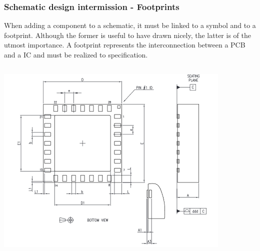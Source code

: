 \documentclass[11pt,xcolor=table,aspectratio=169]{beamer}
\begin{document}
	\begin{frame}
		\frametitle{Schematic design intermission - Footprints}
		When adding a component to a schematic, it must be linked to a symbol and to a footprint. Although the former is useful to have drawn nicely, the latter is of the utmost importance. A footprint represents the interconnection between a PCB and a IC and must be realized to specification.\\\vspace{.5cm}
		\begin{columns}
			\begin{column}{.5\textwidth}
				\centering
				\begin{adjustbox}{max height=.5\textheight}
					\includegraphics[width=\textwidth]{media/footprint_data.png}
				\end{adjustbox}
			\end{column}
			\begin{column}{.5\textwidth}
				\centering
				\begin{adjustbox}{max height=.5\textheight}

\end{adjustbox}
\end{column}
\end{columns}
\end{frame}
\end{document}
